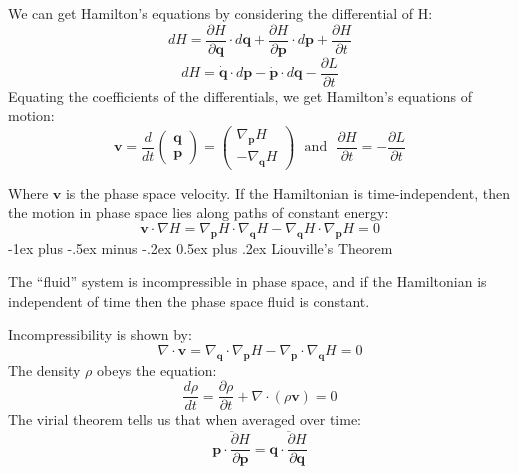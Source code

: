 \documentclass[10pt,landscape]{article}
\makeatletter
\renewcommand{\section}{\@startsection{section}{1}{0mm}%
                                {-1ex plus -.5ex minus -.2ex}%
                                {0.5ex plus .2ex}%
                                {\normalfont\large\bfseries}}
\makeatother
\begin{document}
\begin{multicols}{3}
We can get Hamilton's equations by considering the differential of H:
\begin{equation}
	dH = \frac{\partial H}{\partial \mathbf{q}}\cdot d\mathbf{q} + \frac{\partial H}{\partial \mathbf{p}}\cdot d\mathbf{p} + \frac{\partial H}{\partial t}
\end{equation}
\begin{equation}
	dH = \mathbf{\dot q} \cdot d\mathbf{p} - \mathbf{\dot p} \cdot d\mathbf{q} - \frac{\partial L}{\partial t}
\end{equation}
Equating the coefficients of the differentials, we get Hamilton's equations of motion:
\begin{equation}
	\mathbf v =
	\frac{d}{dt}
	\begin{pmatrix}
		\mathbf{q} \\
		\mathbf{p}
		\end{pmatrix} = 
		\begin{pmatrix}
			\nabla_\mathbf{p}H \\ 
		-\nabla_\mathbf{q}H
		\end{pmatrix}\mathrm{\ \ \ and\ \ \ } \frac{\partial H}{\partial t} = -\frac{\partial L}{\partial t}
\end{equation}

Where $\mathbf v$ is the phase space velocity. If the Hamiltonian is time-independent, then the motion in phase space lies along paths of constant energy:
\begin{equation}
	\mathbf {v}\cdot \nabla H = \nabla_\mathbf{p}H\cdot\nabla_\mathbf{q} H - \nabla_\mathbf{q}H\cdot\nabla_\mathbf{p} H = 0
\end{equation}
\section{Liouville's Theorem}

The ``fluid'' system is incompressible in phase space, and if the Hamiltonian is independent of time then the phase space fluid is constant.

Incompressibility is shown by:
\begin{equation}
	\nabla \cdot\mathbf{v} = \nabla_\mathbf{q}\cdot\nabla_\mathbf{p}H - \nabla_\mathbf{p}\cdot\nabla_\mathbf{q} H = 0
\end{equation}
The density $\rho$ obeys the equation:
\begin{equation}
	\frac{d\rho}{dt} = \frac{\partial \rho}{\partial t} + \nabla \cdot (\rho \mathbf{v}) = 0
\end{equation}
The virial theorem tells us that when averaged over time:
\begin{equation}
	\overline{\mathbf{p}\cdot\frac{\partial H}{\partial \mathbf{p}}} = \overline{\mathbf{q}\cdot \frac{\partial H}{\partial \mathbf{q}}}
\end{equation}

\end{multicols}
\end{document}
